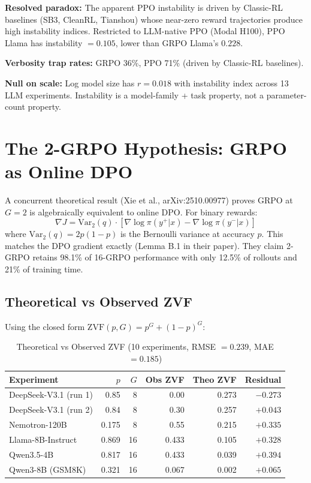 \documentclass[12pt,a4paper]{report}
\theoremstyle{definition}
\begin{document}
\textbf{Resolved paradox:} The apparent PPO instability is driven by Classic-RL baselines (SB3, CleanRL,
Tianshou) whose near-zero reward trajectories produce high instability indices. Restricted to
LLM-native PPO (Modal H100), PPO Llama has instability $= 0.105$, lower than GRPO Llama's $0.228$.

\textbf{Verbosity trap rates:} GRPO 36\%, PPO 71\% (driven by Classic-RL baselines).

\textbf{Null on scale:} Log model size has $r = 0.018$ with instability index across 13 LLM
experiments. Instability is a model-family + task property, not a parameter-count property.

\section{The 2-GRPO Hypothesis: GRPO as Online DPO}
\label{sec:two-grpo}

A concurrent theoretical result (Xie et al., arXiv:2510.00977) proves GRPO at $G = 2$ is algebraically
equivalent to online DPO. For binary rewards:
\[
\nabla J = \mathrm{Var}_2(q) \cdot [\nabla \log \pi(y^+ | x) - \nabla \log \pi(y^- | x)]
\]
where $\mathrm{Var}_2(q) = 2p(1 - p)$ is the Bernoulli variance at accuracy $p$. This matches the DPO
gradient exactly (Lemma B.1 in their paper). They claim 2-GRPO retains 98.1\% of 16-GRPO performance
with only 12.5\% of rollouts and 21\% of training time.

\subsection{Theoretical vs Observed ZVF}

Using the closed form $\mathrm{ZVF}(p, G) = p^G + (1-p)^G$:

\begin{table}[htbp]
\centering
\caption{Theoretical vs Observed ZVF (10 experiments, RMSE $= 0.239$, MAE $= 0.185$)}
\label{tab:zvf-theoretical}
\footnotesize
\begin{tabular}{lrrrrr}
\toprule
\textbf{Experiment} & \textbf{$p$} & \textbf{$G$} & \textbf{Obs ZVF} & \textbf{Theo ZVF} & \textbf{Residual} \\
\midrule
DeepSeek-V3.1 (run 1)  & 0.85  & 8  & 0.00  & 0.273 & $-0.273$ \\
DeepSeek-V3.1 (run 2)  & 0.84  & 8  & 0.30  & 0.257 & $+0.043$ \\
Nemotron-120B          & 0.175 & 8  & 0.55  & 0.215 & $+0.335$ \\
Llama-8B-Instruct      & 0.869 & 16 & 0.433 & 0.105 & $+0.328$ \\
Qwen3.5-4B             & 0.817 & 16 & 0.433 & 0.039 & $+0.394$ \\
Qwen3-8B (GSM8K)       & 0.321 & 16 & 0.067 & 0.002 & $+0.065$ \\
\bottomrule
\end{tabular}
\end{table}
\end{document}
